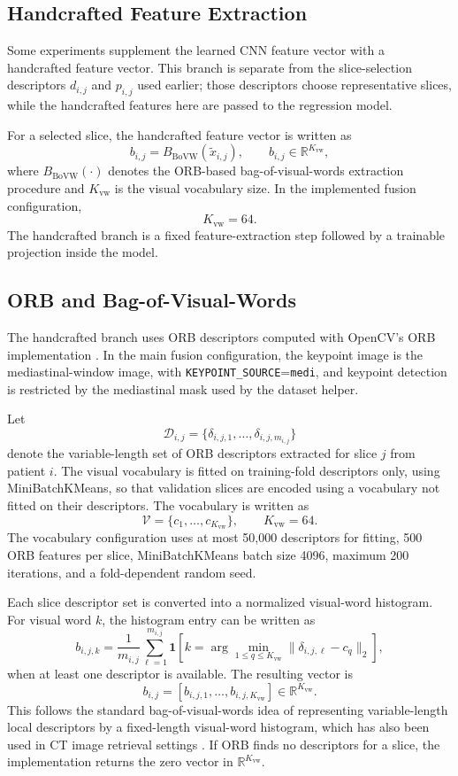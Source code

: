 \subsection{Handcrafted Feature Extraction}
\label{sec:handcrafted_feature_extraction}

Some experiments supplement the learned CNN feature vector with a handcrafted feature vector. This branch is separate from the slice-selection descriptors \(d_{i,j}\) and \(p_{i,j}\) used earlier; those descriptors choose representative slices, while the handcrafted features here are passed to the regression model.

For a selected slice, the handcrafted feature vector is written as
\[
b_{i,j}
=
B_{\mathrm{BoVW}}(\tilde{x}_{i,j}),
\qquad
b_{i,j}
\in
\mathbb{R}^{K_{\mathrm{vw}}},
\]
where \(B_{\mathrm{BoVW}}(\cdot)\) denotes the ORB-based bag-of-visual-words extraction procedure and \(K_{\mathrm{vw}}\) is the visual vocabulary size. In the implemented fusion configuration,
\[
K_{\mathrm{vw}} = 64.
\]
The handcrafted branch is a fixed feature-extraction step followed by a trainable projection inside the model.


\subsection{ORB and Bag-of-Visual-Words}
\label{sec:orb_bovw}

The handcrafted branch uses ORB descriptors computed with OpenCV's ORB implementation \cite{rublee2011orb}. In the main fusion configuration, the keypoint image is the mediastinal-window image, with \texttt{KEYPOINT\_SOURCE}=\texttt{medi}, and keypoint detection is restricted by the mediastinal mask used by the dataset helper.

Let
\[
\mathcal{D}_{i,j}
=
\{\delta_{i,j,1},\dots,\delta_{i,j,m_{i,j}}\}
\]
denote the variable-length set of ORB descriptors extracted for slice \(j\) from patient \(i\). The visual vocabulary is fitted on training-fold descriptors only, using MiniBatchKMeans, so that validation slices are encoded using a vocabulary not fitted on their descriptors. The vocabulary is written as
\[
\mathcal{V}
=
\{c_1,\dots,c_{K_{\mathrm{vw}}}\},
\qquad
K_{\mathrm{vw}}=64.
\]
The vocabulary configuration uses at most 50,000 descriptors for fitting, 500 ORB features per slice, MiniBatchKMeans batch size 4096, maximum 200 iterations, and a fold-dependent random seed.

Each slice descriptor set is converted into a normalized visual-word histogram. For visual word \(k\), the histogram entry can be written as
\[
b_{i,j,k}
=
\frac{1}{m_{i,j}}
\sum_{\ell=1}^{m_{i,j}}
\mathbf{1}
\!\left[
k
=
\arg\min_{1 \leq q \leq K_{\mathrm{vw}}}
\|\delta_{i,j,\ell}-c_q\|_2
\right],
\]
when at least one descriptor is available. The resulting vector is
\[
b_{i,j}
=
\left[
b_{i,j,1},\dots,b_{i,j,K_{\mathrm{vw}}}
\right]
\in
\mathbb{R}^{K_{\mathrm{vw}}}.
\]
This follows the standard bag-of-visual-words idea of representing variable-length local descriptors by a fixed-length visual-word histogram, which has also been used in CT image retrieval settings \cite{yang2012bovwct}. If ORB finds no descriptors for a slice, the implementation returns the zero vector in \(\mathbb{R}^{K_{\mathrm{vw}}}\).


